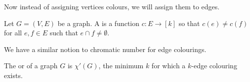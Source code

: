 \documentclass[a4paper]{scrreprt}
\begin{document}
Now instead of assigning vertices colours, we will assign them to edges. 

\begin{definition}
	Let $G = (V, E)$ be a graph. A  is a function $c:E \rightarrow [k]$ so that $c(e) \neq c(f)$ for all $e, f \in E$ such that $e \cap f \neq \emptyset.$
\end{definition}

We have a similar notion to chromatic number for edge colourings.

\begin{definition}
	The  or  of a graph $G$ is $\chi'(G)$, the minimum $k$ for which a $k$-edge colouring exists.
\end{definition}
\end{document}
